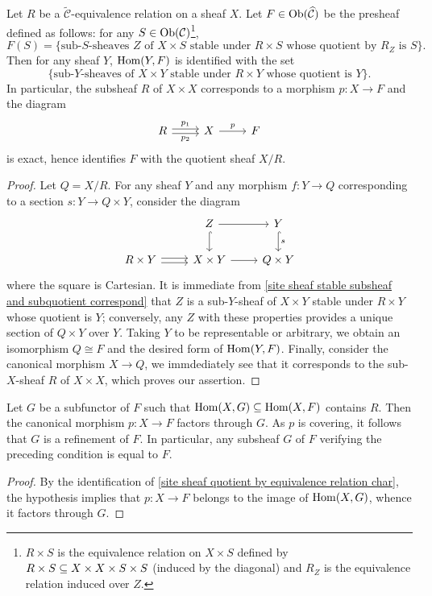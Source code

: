 \begin{proposition}\label{site sheaf quotient by equivalence relation char}
Let $R$ be a $\widetilde{\mathcal{C}}$-equivalence relation on a sheaf $X$. Let $F\in\mathrm{Ob}(\widehat{\mathcal{C}})$ be the presheaf defined as follows: for any $S\in\mathrm{Ob}(\mathcal{C})$\footnote{$R\times S$ is the equivalence relation on $X\times S$ defined by $R\times S\subseteq X\times X\times S\times S$ (induced by the diagonal) and $R_Z$ is the equivalence relation induced over $Z$.},
\begin{equation*}
F(S)=\{\text{sub-$S$-sheaves $Z$ of $X\times S$ stable under $R\times S$ whose quotient by $R_Z$ is $S$}\}.
\end{equation*}
Then for any sheaf $Y$, $\mathrm{Hom}(Y,F)$ is identified with the set
\[\{\text{sub-$Y$-sheaves of $X\times Y$ stable under $R\times Y$ whose quotient is $Y$}\}.\]
In particular, the subsheaf $R$ of $X\times X$ corresponds to a morphism $p:X\to F$ and the diagram
\[\begin{tikzcd}
R\ar[r,shift left=2pt,"p_1"]\ar[r,shift right=2pt,swap,"p_2"]&X\ar[r,"p"]&F
\end{tikzcd}\]
is exact, hence identifies $F$ with the quotient sheaf $X/R$.
\end{proposition}
\begin{proof}
Let $Q=X/R$. For any sheaf $Y$ and any morphism $f:Y\to Q$ corresponding to a section $s:Y\to Q\times Y$, consider the diagram
\begin{equation}\label{site sheaf quotient by equivalence relation char-1}
\begin{tikzcd}
&Z\ar[r]\ar[d,hook]&Y\ar[d,hook,"s"]\\
R\times Y\ar[r,shift left=2pt]\ar[r,shift right=2pt]&X\times Y\ar[r]&Q\times Y
\end{tikzcd}
\end{equation}
where the square is Cartesian. It is immediate from \cref{site sheaf stable subsheaf and subquotient correspond} that $Z$ is a sub-$Y$-sheaf of $X\times Y$ stable under $R\times Y$ whose quotient is $Y$; conversely, any $Z$ with these properties provides a unique section of $Q\times Y$ over $Y$. Taking $Y$ to be representable or arbitrary, we obtain an isomorphism $Q\cong F$ and the desired form of $\mathrm{Hom}(Y,F)$. Finally, consider the canonical morphism $X\to Q$, we immdediately see that it corresponds to the sub-$X$-sheaf $R$ of $X\times X$, which proves our assertion.
\end{proof}

\begin{corollary}\label{site sheaf quotient factor through if}
Let $G$ be a subfunctor of $F$ such that $\mathrm{Hom}(X,G)\subseteq\mathrm{Hom}(X,F)$ contains $R$. Then the canonical morphism $p:X\to F$ factors through $G$. As $p$ is covering, it follows that $G$ is a refinement of $F$. In particular, any subsheaf $G$ of $F$ verifying the preceding condition is equal to $F$.
\end{corollary}
\begin{proof}
By the identification of \cref{site sheaf quotient by equivalence relation char}, the hypothesis implies that $p:X\to F$ belongs to the image of $\mathrm{Hom}(X,G)$, whence it factors through $G$.
\end{proof}

